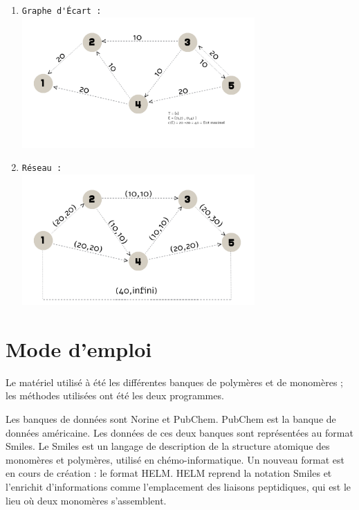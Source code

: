 \documentclass[11pt, a4paper]{report}
\begin{document}
\begin{enumerate}
	\pagebreak
		\item \verb|Graphe d'Écart :|\\
	\includegraphics[width=0.7\textwidth]{images/GE4.png}\\
		\item \verb|Réseau :|\\
	\includegraphics[width=0.7\textwidth]{images/R2.png}\\
	\end{enumerate}
	
	
	
	\chapter{Mode d'emploi}
	Le matériel utilisé à été les différentes banques de polymères et de monomères ; les méthodes utilisées ont été les deux programmes.
	
	Les banques de données sont Norine et PubChem. PubChem est la banque de données américaine. Les données de ces deux banques sont représentées au format Smiles. Le Smiles est un langage de description de la structure atomique des monomères et polymères, utilisé en chémo-informatique. Un nouveau format est en cours de création : le format HELM. HELM reprend la notation Smiles et l'enrichit d'informations comme l'emplacement des liaisons peptidiques, qui est le lieu où deux monomères s'assemblent.
		
\end{document}
